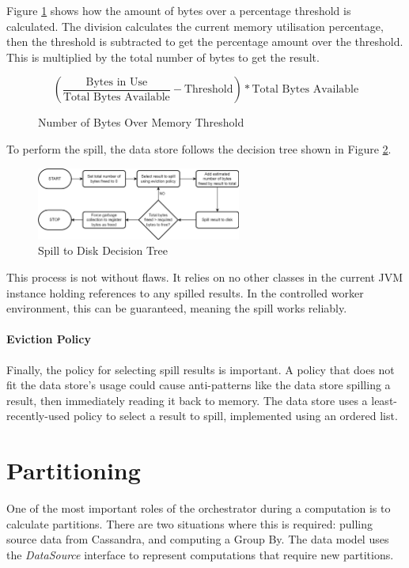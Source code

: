 Figure \ref{fig:bytes-over-memory-threshold} shows how the amount of bytes over a percentage threshold is calculated. The division calculates the current memory utilisation percentage, then the threshold is subtracted to get the percentage amount over the threshold. This is multiplied by the total number of bytes to get the result.

\begin{figure}[h]
	\centering
	\[ \left( \frac{\text{Bytes in Use}}{\text{Total Bytes Available}} - \text{Threshold} \right) * \text{Total Bytes Available} \]
	\caption{Number of Bytes Over Memory Threshold}
	\label{fig:bytes-over-memory-threshold}
\end{figure}

To perform the spill, the data store follows the decision tree shown in Figure \ref{fig:spill-to-disk-process}.

\begin{figure}[h]
	\centering
	\includegraphics[width=0.6\textwidth]{chapters/diagrams/implementation/spill-to-disk-process}
	\caption{Spill to Disk Decision Tree}
	\label{fig:spill-to-disk-process}
\end{figure}

This process is not without flaws. It relies on no other classes in the current JVM instance holding references to any spilled results. In the controlled worker environment, this can be guaranteed, meaning the spill works reliably. 

\paragraph{Eviction Policy}
Finally, the policy for selecting spill results is important. A policy that does not fit the data store's usage could cause anti-patterns like the data store spilling a result, then immediately reading it back to memory. The data store uses a least-recently-used policy to select a result to spill, implemented using an ordered list.



\section{Partitioning}
One of the most important roles of the orchestrator during a computation is to calculate partitions. There are two situations where this is required:  pulling source data from Cassandra, and computing a Group By. The data model uses the \textit{DataSource} interface to represent computations that require new partitions. 

